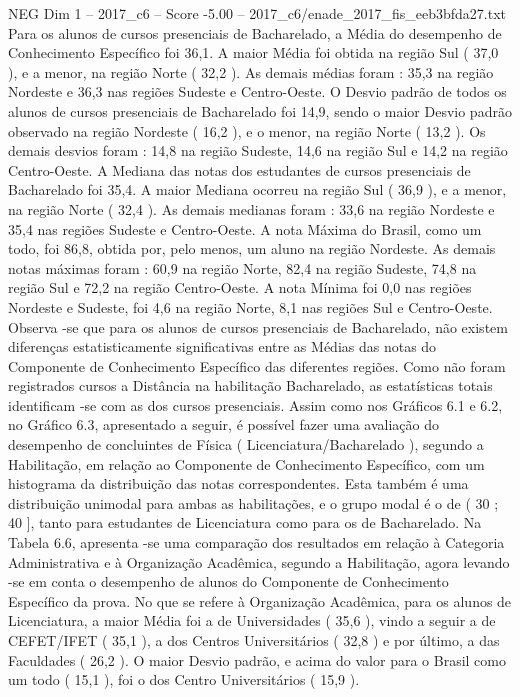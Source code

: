\begin{textsample}{NEG Dim 1 – 2017\_c6 – Score -5.00 – 2017\_c6/enade\_2017\_fis\_eeb3bfda27.txt}
Para os alunos de cursos presenciais de Bacharelado, a Média do desempenho de Conhecimento Específico foi 36,1.
A maior Média foi obtida na região Sul ( 37,0 ), e a menor, na região Norte ( 32,2 ).
As demais médias foram : 35,3 na região Nordeste e 36,3 nas regiões Sudeste e Centro-Oeste.
O Desvio padrão de todos os alunos de cursos presenciais de Bacharelado foi 14,9, sendo o maior Desvio padrão observado na região Nordeste ( 16,2 ), e o menor, na região Norte ( 13,2 ).
Os demais desvios foram : 14,8 na região Sudeste, 14,6 na região Sul e 14,2 na região Centro-Oeste.
A Mediana das notas dos estudantes de cursos presenciais de Bacharelado foi 35,4.
A maior Mediana ocorreu na região Sul ( 36,9 ), e a menor, na região Norte ( 32,4 ).
As demais medianas foram : 33,6 na região Nordeste e 35,4 nas regiões Sudeste e Centro-Oeste.
A nota Máxima do Brasil, como um todo, foi 86,8, obtida por, pelo menos, um aluno na região Nordeste.
As demais notas máximas foram : 60,9 na região Norte, 82,4 na região Sudeste, 74,8 na região Sul e 72,2 na região Centro-Oeste.
A nota Mínima foi 0,0 nas regiões Nordeste e Sudeste, foi 4,6 na região Norte, 8,1 nas regiões Sul e Centro-Oeste.
Observa -se que para os alunos de cursos presenciais de Bacharelado, não existem diferenças estatisticamente significativas entre as Médias das notas do Componente de Conhecimento Específico das diferentes regiões.
Como não foram registrados cursos a Distância na habilitação Bacharelado, as estatísticas totais identificam -se com as dos cursos presenciais.
Assim como nos Gráficos 6.1 e 6.2, no Gráfico 6.3, apresentado a seguir, é possível fazer uma avaliação do desempenho de concluintes de Física ( Licenciatura/Bacharelado ), segundo a Habilitação, em relação ao Componente de Conhecimento Específico, com um histograma da distribuição das notas correspondentes.
Esta também é uma distribuição unimodal para ambas as habilitações, e o grupo modal é o de ( 30 ; 40 ], tanto para estudantes de Licenciatura como para os de Bacharelado.
Na Tabela 6.6, apresenta -se uma comparação dos resultados em relação à Categoria Administrativa e à Organização Acadêmica, segundo a Habilitação, agora levando -se em conta o desempenho de alunos do Componente de Conhecimento Específico da prova.
No que se refere à Organização Acadêmica, para os alunos de Licenciatura, a maior Média foi a de Universidades ( 35,6 ), vindo a seguir a de CEFET/IFET ( 35,1 ), a dos Centros Universitários ( 32,8 ) e por último, a das Faculdades ( 26,2 ).
O maior Desvio padrão, e acima do valor para o Brasil como um todo ( 15,1 ), foi o dos Centro Universitários ( 15,9 ).

\end{textsample}
